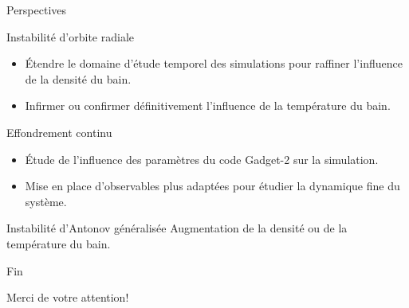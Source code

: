 \documentclass[slidetop,12pt,ucs]{beamer}
\renewcommand{\(}{\ensuremath{\left(}}
\renewcommand{\)}{\ensuremath{\right)}}
\begin{document}
		\begin{frame}[t]{Perspectives}
			\begin{block}{Instabilité d'orbite radiale}
				\begin{itemize}
					\item \small{Étendre le domaine d'étude temporel des simulations pour raffiner l'influence de la densité du bain.}
					\item \small{Infirmer ou confirmer définitivement l'influence de la température du bain.}
				\end{itemize}
			\end{block}
			\begin{block}{Effondrement continu}
				\begin{itemize}
					\item \small{Étude de l'influence des paramètres du code Gadget-2 sur la simulation.}
					\item \small{Mise en place d'observables plus adaptées pour étudier la dynamique fine du système.}
				\end{itemize}
			\end{block}
			\begin{block}{Instabilité d'Antonov généralisée}
				\small{Augmentation de la densité ou de la température du bain.}
			\end{block}
		\end{frame}

		\begin{frame}[t]{Fin}

			\begin{block}{}
				\centering Merci de votre attention!
			\end{block}
		\end{frame}
\end{document}
